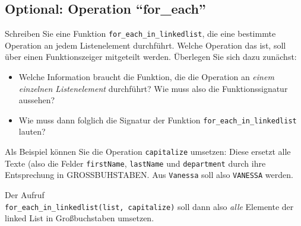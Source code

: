 \documentclass[
	ngerman,
	fontsize=10pt,
	parskip=half,
	titlepage=true,
	DIV=12
]{scrartcl}
\begin{document}
\subsection*{Optional: Operation \enquote{for\_each}}
Schreiben Sie eine Funktion \texttt{for\_each\_in\_linkedlist}, die eine bestimmte Operation an jedem Listenelement durchführt. Welche Operation das ist, soll über einen Funktionszeiger mitgeteilt werden. Überlegen Sie sich dazu zunächst:
\begin{itemize}
\item Welche Information braucht die Funktion, die die Operation an \emph{einem einzelnen Listenelement} durchführt? Wie muss also die Funktionssignatur aussehen?
\item Wie muss dann folglich die Signatur der Funktion \texttt{for\_each\_in\_linkedlist} lauten?
\end{itemize}

Als Beispiel können Sie die Operation \texttt{capitalize} umsetzen: Diese ersetzt alle Texte (also die Felder \texttt{firstName}, \texttt{lastName} und \texttt{department} durch ihre Entsprechung in GROSSBUHSTABEN. Aus \texttt{Vanessa} soll also \texttt{VANESSA} werden.

Der Aufruf\\
\texttt{for\_each\_in\_linkedlist(list, capitalize)}
soll dann also \emph{alle} Elemente der linked List in Großbuchstaben umsetzen.
\end{document}
